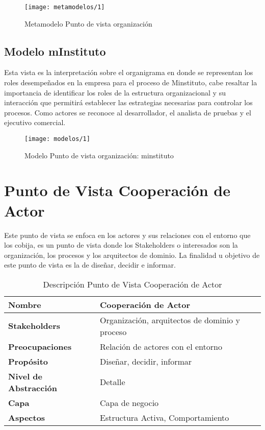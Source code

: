  \begin{figure}[H]
   \centering
   \texttt{[image: metamodelos/1]}
   \captionsetup{width=.95\textwidth}
   \caption{Metamodelo Punto de vista organización}
   \label{metamodelo1}
 \end{figure}

 \subsection{Modelo mInstituto}
 Esta vista es la interpretación sobre el organigrama en donde se representan los roles desempeñados en la empresa para el proceso de Minstituto, cabe resaltar la importancia de identificar los roles de la estructura organizacional y su interacción que permitirá establecer las estrategias necesarias para controlar los procesos.  Como actores se reconoce al desarrollador, el analista de pruebas y el ejecutivo comercial.
  \begin{figure}[H]
   \centering
   \texttt{[image: modelos/1]}
   \captionsetup{width=.95\textwidth}
   \caption{Modelo Punto de vista organización: minstituto}
   \label{modelo1}
  \end{figure}
  
  \section{Punto de Vista Cooperación de Actor}
  Este punto de vista se enfoca en los actores y sus relaciones con el entorno que los cobija, es un punto de vista donde los Stakeholders o interesados son la organización, los procesos y los arquitectos de dominio. La finalidad u objetivo de este punto de vista es la de diseñar, decidir e informar.
  
  \begin{table}[H]
  	\centering
  	\begin{tabular}{p{3.7cm}p{8cm}}
  		\hline
  		\rowcolor[HTML]{0073a1}
  		{\color[HTML]{FFFFFF} \textbf{Nombre}} & {\color[HTML]{FFFFFF} \textbf{Cooperación de Actor}} \\
  		\hline
  		\textbf{Stakeholders} & Organización, arquitectos de dominio y proceso \\
  		\textbf{Preocupaciones} & Relación de actores con el entorno \\
  		\textbf{Propósito} & Diseñar, decidir, informar \\
  		\textbf{Nivel de Abstracción} & Detalle \\
  		\textbf{Capa} & Capa de negocio \\
  		\textbf{Aspectos} & Estructura Activa, Comportamiento \\
  		\bottomrule
  	\end{tabular}
  	\captionsetup{width=.95\textwidth}
  	\caption{Descripción Punto de Vista Cooperación de Actor}
  	\label{tabla5}
  \end{table}
  
